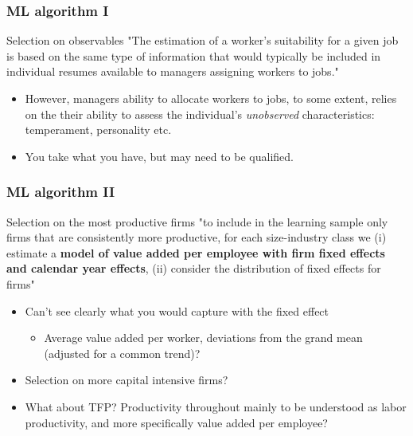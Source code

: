 \documentclass[usenames,dvipsnames,10pt]{beamer}
\begin{document}
\begin{frame} 
\frametitle{ML algorithm I} 
\begin{exampleblock}{Selection on observables}
{"The estimation of a worker’s suitability for a given job is based on the same type of information that
would typically be included in individual resumes available to managers assigning workers to jobs."}
\end{exampleblock}
\begin{itemize}
\item However, managers ability to allocate workers to jobs, to some extent, relies on the their ability to assess the individual's \emph{unobserved} characteristics: temperament, personality etc.
\item You take what you have, but may need to be qualified.
\end{itemize}
\end{frame}

\begin{frame} 
\frametitle{ML algorithm II} 
\begin{exampleblock}{Selection on the most productive firms}
"to include in the learning sample only firms that are consistently more productive, for each size-industry class we (i) estimate a \textbf{model of value added per employee with firm fixed effects and calendar year effects}, (ii) consider the distribution of fixed effects for firms"
\end{exampleblock}
\begin{itemize}
\item Can't see clearly what you would capture with the fixed effect 
\begin{itemize}
\item Average value added per worker, deviations from the grand mean (adjusted for a common trend)? 
\end{itemize}
\item Selection on more capital intensive firms?
\item What about TFP? Productivity throughout mainly to be understood as labor productivity, and more specifically value added per employee?
\end{itemize}
\end{frame}
\end{document}
